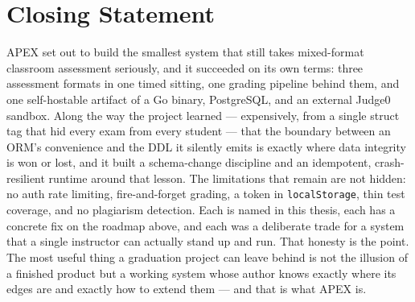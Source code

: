 \section{Closing Statement}

APEX set out to build the smallest system that still takes mixed-format
classroom assessment seriously, and it succeeded on its own terms: three
assessment formats in one timed sitting, one grading pipeline behind them, and
one self-hostable artifact of a Go binary, PostgreSQL, and an external Judge0
sandbox. Along the way the project learned --- expensively, from a single struct
tag that hid every exam from every student --- that the boundary between an ORM's
convenience and the DDL it silently emits is exactly where data integrity is won
or lost, and it built a schema-change discipline and an idempotent,
crash-resilient runtime around that lesson. The limitations that remain are not
hidden: no auth rate limiting, fire-and-forget grading, a token in
\texttt{localStorage}, thin test coverage, and no plagiarism detection. Each is
named in this thesis, each has a concrete fix on the roadmap above, and each was
a deliberate trade for a system that a single instructor can actually stand up
and run. That honesty is the point. The most useful thing a graduation project
can leave behind is not the illusion of a finished product but a working system
whose author knows exactly where its edges are and exactly how to extend them ---
and that is what APEX is.

